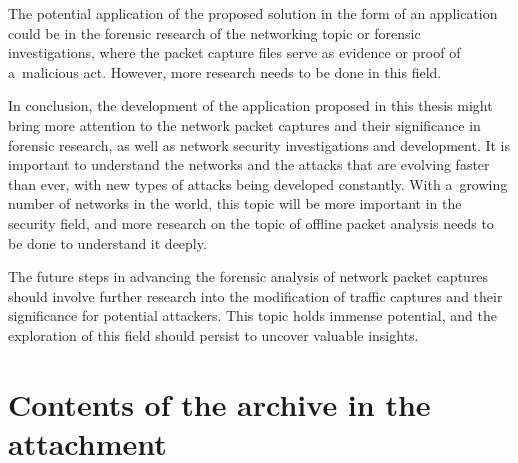 \documentclass[
  printed,     %
  color,       %
  oneside,     %
  nosansbold,  %
  nocolorbold, %
  nolof,         %
  nolot,         %
]{fithesis4}
\begin{document}
The potential application of the proposed solution in the form of an application could be in the forensic research of the networking topic or forensic investigations, where the packet capture files serve as evidence or proof of a~malicious act. However, more research needs to be done in this field.

In conclusion, the development of the application proposed in this thesis might bring more attention to the network packet captures and their significance in forensic research, as well as network security investigations and development. It is important to understand the networks and the attacks that are evolving faster than ever, with new types of attacks being developed constantly. With a~growing number of networks in the world, this topic will be more important in the security field, and more research on the topic of offline packet analysis needs to be done to understand it deeply.

The future steps in advancing the forensic analysis of network packet captures should involve further research into the modification of traffic captures and their significance for potential attackers. This topic holds immense potential, and the exploration of this field should persist to uncover valuable insights.

\appendix %
\chapter{Contents of the archive in the attachment}

\end{document}
